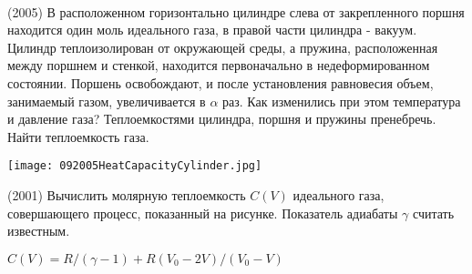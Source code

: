 \begin{ex}
\hspace{0pt} \\
\begin{minipage}{.65\textwidth}
(2005) В расположенном горизонтально цилиндре слева от закрепленного поршня находится один моль идеального газа, в правой части цилиндра - вакуум. Цилиндр теплоизолирован от окружающей среды, а пружина, расположенная между поршнем и стенкой, находится первоначально в недеформированном состоянии. Поршень освобождают, и после установления равновесия объем, занимаемый газом, увеличивается в $\alpha$ раз. Как изменились при этом температура и давление газа? Теплоемкостями цилиндра, поршня и пружины пренебречь. Найти теплоемкость газа.
\end{minipage}
\begin{minipage}{.35\textwidth}
\centering
\texttt{[image: 092005HeatCapacityCylinder.jpg]}
\end{minipage}
\begin{ans}

\end{ans}
\end{ex}

\begin{ex}
(2001) Вычислить молярную теплоемкость $C(V)$ идеального газа, совершающего процесс, показанный на рисунке. Показатель адиабаты $\gamma$ считать известным.
\begin{center}
\end{center}
\begin{ans}
$C(V) = R/(\gamma-1)+R(V_0-2V)/(V_0-V)$
\end{ans}
\end{ex}